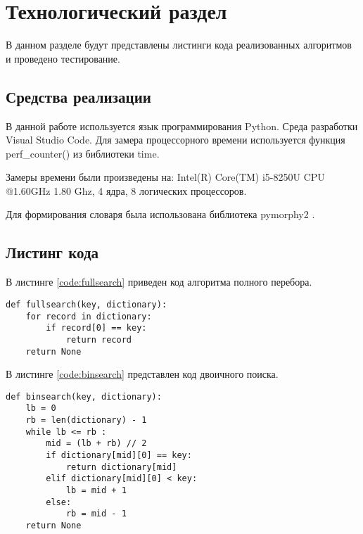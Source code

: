 \chapter{Технологический раздел}
\label{cha:impl}
В данном разделе будут представлены листинги кода реализованных алгоритмов и проведено тестирование.

\section{Средства реализации}
В данной работе используется язык программирования Python. Среда разработки Visual Studio Code. Для замера процессорного времени используется функция perf\_counter() из библиотеки time.
\par Замеры времени были произведены на: Intel(R) Core(TM) i5-8250U CPU @1.60GHz 1.80 Ghz, 4 ядра, 8 логических процессоров.
\par Для формирования словаря была использована библиотека pymorphy2 \cite{pymorphy}.

\section{Листинг кода}
В листинге \ref{code:fullsearch} приведен код алгоритма полного перебора.
\begin{lstlisting}[caption= Алгоритм полного перебора, label=code:fullsearch]
def fullsearch(key, dictionary):
	for record in dictionary:
		if record[0] == key:
			return record
	return None
\end{lstlisting}

\par В листинге \ref{code:binsearch} представлен код двоичного поиска.
\begin{lstlisting}[caption= Муравьиный алгоритм, label=code:binsearch]
def binsearch(key, dictionary):
	lb = 0
	rb = len(dictionary) - 1
	while lb <= rb :
		mid = (lb + rb) // 2
		if dictionary[mid][0] == key:
			return dictionary[mid]
		elif dictionary[mid][0] < key:
			lb = mid + 1
		else:
			rb = mid - 1
	return None
\end{lstlisting}

